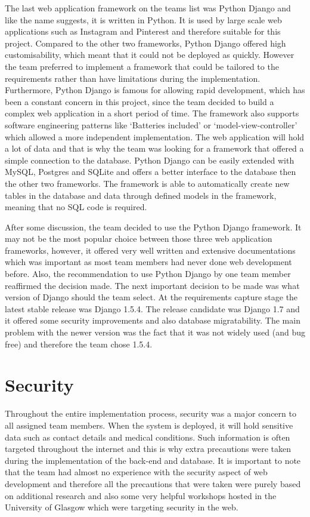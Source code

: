 \documentclass{l3proj}
\begin{document}
The last web application framework on the teams list was Python Django and like the name suggests, it is written in Python. It is used by large scale web applications such as Instagram and Pinterest and therefore suitable for this project. Compared to the other two frameworks, Python Django offered high customisability, which meant that it could not be deployed as quickly. However the team preferred to implement a framework that could be tailored to the requirements rather than have limitations during the implementation. Furthermore, Python Django is famous for allowing rapid development, which has been a constant concern in this project, since the team decided to build a complex web application in a short period of time. The framework also supports software engineering patterns like `Batteries included' or `model-view-controller' which allowed a more independent implementation. The web application will hold a lot of data and that is why the team was looking for a framework that offered a simple connection to the database. Python Django can be easily extended with MySQL, Postgres and SQLite and offers a better interface to the database then the other two frameworks. The framework is able to automatically create new tables in the database and data through defined models in the framework, meaning that no SQL code is required.\\
\par
After some discussion, the team decided to use the Python Django framework. It may not be the most popular choice between those three web application frameworks, however, it offered very well written and extensive documentations which was important as most team members had never done web development before. Also, the recommendation to use Python Django by one team member reaffirmed the decision made. The next important decision to be made was what version of Django should the team select. At the requirements capture stage the latest stable release was Django 1.5.4. The release candidate was Django 1.7 and it offered some security improvements and also database migratability. The main problem with the newer version was the fact that it was not widely used (and bug free) and therefore the team chose 1.5.4.

\section{Security}
Throughout the entire implementation process, security was a major concern to all assigned team members. When the system is deployed, it will hold sensitive data such as contact details and medical conditions. Such information is often targeted throughout the internet and this is why extra precautions were taken during the implementation of the back-end and database. It is important to note that the team had almost no experience with the security aspect of web development and therefore all the precautions that were taken were purely based on additional research and also some very helpful workshops hosted in the University of Glasgow which were targeting security in the web.\\
\end{document}
